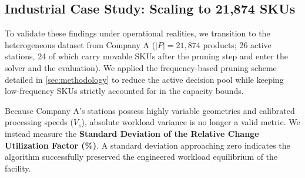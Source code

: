 \documentclass[preprint,review,11pt,authoryear]{elsarticle}
\begin{document}
\subsection{Industrial Case Study: Scaling to 21,874 SKUs}
To validate these findings under operational realities, we transition to the heterogeneous dataset from Company A ($|P|=21,874$ products; 26 active stations, 24 of which carry movable SKUs after the pruning step and enter the solver and the evaluation). We applied the frequency-based pruning scheme detailed in \cref{sec:methodology} to reduce the active decision pool while keeping low-frequency SKUs strictly accounted for in the capacity bounds.

Because Company A's stations possess highly variable geometries and calibrated processing speeds ($V_s$), absolute workload variance is no longer a valid metric. We instead measure the \textbf{Standard Deviation of the Relative Change Utilization Factor (\%)}. A standard deviation approaching zero indicates the algorithm successfully preserved the engineered workload equilibrium of the facility.
\end{document}
